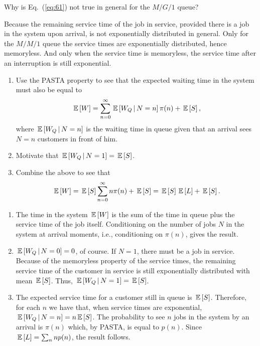 \begin{question}
  Why is Eq.~(\ref{eq:61}) not true in general for the $M/G/1$ queue?
  \begin{solution}
    Because the remaining service time of the job in service, provided
    there is a job in the system upon arrival, is not exponentially
    distributed in general. Only for the $M/M/1$ queue the service
    times are exponentially distributed, hence memoryless. And only
    when the service time is memoryless, the service time after an
    interruption is still exponential.
  \end{solution}
\end{question}

\begin{question}
  \begin{enumerate}
  \item 
  Use the PASTA property to see that the expected waiting time in the
  system must also be equal to
\begin{equation*}
  \,\mathbb{E}\left[W\right] = \sum_{n=0}^\infty \,\mathbb{E}\left[W_Q \,\middle|\, N=n\right] \pi(n) + \,\mathbb{E}\left[S\right],
\end{equation*}
where $\,\mathbb{E}\left[W_Q \,\middle|\, N=n\right]$ is the waiting time in queue given that an
arrival sees $N=n$ customers in front of him. 
\item Motivate that $\,\mathbb{E}\left[W_Q \,\middle|\, N=1\right] = \,\mathbb{E}\left[S\right]$. 
\item  Combine the above to see that 
\begin{equation*}
  \,\mathbb{E}\left[W\right] = \,\mathbb{E}\left[S\right] \sum_{n=0}^\infty n \pi(n) + \,\mathbb{E}\left[S\right] = \,\mathbb{E}\left[S\right] \,\mathbb{E}\left[L\right] + \,\mathbb{E}\left[S\right].
\end{equation*}
  \end{enumerate}
  \begin{solution}
    \begin{enumerate}
    \item The time in the system $\,\mathbb{E}\left[W\right]$ is the sum of the time in
      queue plus the service time of the job itself.  Conditioning on
      the number of jobs $N$ in the system at arrival moments, i.e.,
      conditioning on $\pi(n)$, gives the result.  
    \item $\,\mathbb{E}\left[W_Q\,\middle|\, N=0\right]=0$, of course. If $N=1$, there must be a job
      in service.  Because of the memoryless property of the service
      times, the remaining service time of the customer in service is
      still exponentially distributed with mean $\,\mathbb{E}\left[S\right]$. Thus,
      $\,\mathbb{E}\left[W_Q\,\middle|\, N=1\right]=\,\mathbb{E}\left[S\right]$. 
    \item The expected service time for a customer still in queue is
      $\,\mathbb{E}\left[S\right]$.  Therefore, for each $n$ we have that, when service
      times are exponential, $\,\mathbb{E}\left[W_Q\,\middle|\, N=n\right]= n \,\mathbb{E}\left[S\right]$. The probability
      to see $n$ jobs in the system by an arrival is $\pi(n)$ which,
      by PASTA, is equal to $p(n)$. Since $\,\mathbb{E}\left[L\right] = \sum_n n p(n)$, the
      result follows.
    \end{enumerate}
  \end{solution}
\end{question}

